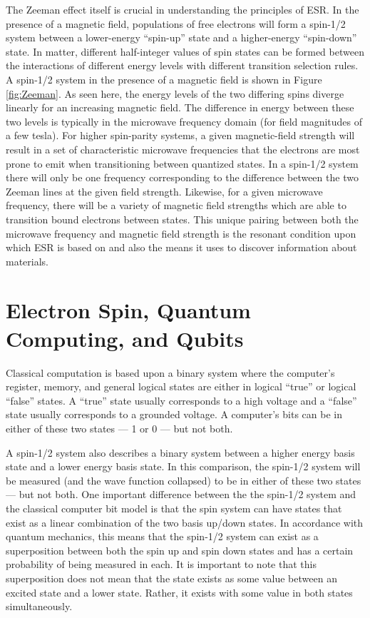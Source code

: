 \documentclass[oneside]{BYUPhys}
\begin{document}
The Zeeman effect itself is crucial in understanding the principles of ESR. In the presence of a magnetic field, populations of free electrons will form a spin-1/2 system between a lower-energy ``spin-up'' state and a higher-energy ``spin-down'' state. In matter, different half-integer values of spin states can be formed between the interactions of different energy levels with different transition selection rules. A spin-1/2 system in the presence of a magnetic field is shown in Figure \ref{fig:Zeeman}. As seen here, the energy levels of the two differing spins diverge linearly for an increasing magnetic field. The difference in energy between these two levels is typically in the microwave frequency domain (for field magnitudes of a few tesla). For higher spin-parity systems, a given magnetic-field strength will result in a set of characteristic microwave frequencies that the electrons are most prone to emit when transitioning between quantized states. In a spin-1/2 system there will only be one frequency corresponding to the difference between the two Zeeman lines at the given field strength. Likewise, for a given microwave frequency, there will be a variety of magnetic field strengths which are able to transition bound electrons between states. This unique pairing between both the microwave frequency and magnetic field strength is the resonant condition upon which ESR is based on and also the means it uses to discover information about materials.

\section{Electron Spin, Quantum Computing, and Qubits}

Classical computation is based upon a binary system where the computer's register, memory, and general logical states are either in logical ``true'' or logical ``false'' states. A ``true'' state usually corresponds to a high voltage and a ``false'' state usually corresponds to a grounded voltage. A computer's bits can be in either of these two states --- 1 or 0 --- but not both.

A spin-1/2 system also describes a binary system between a higher energy basis state and a lower energy basis state. In this comparison, the spin-1/2 system will be measured (and the wave function collapsed) to be in either of these two states --- but not both. One important difference between the the spin-1/2 system and the classical computer bit model is that the spin system can have states that exist as a linear combination of the two basis up/down states. In accordance with quantum mechanics, this means that the spin-1/2 system can exist as a superposition between both the spin up and spin down states and has a certain probability of being measured in each. It is important to note that this superposition does not mean that the state exists as some value between an excited state and a lower state. Rather, it exists with some value in both states simultaneously.
\end{document}
